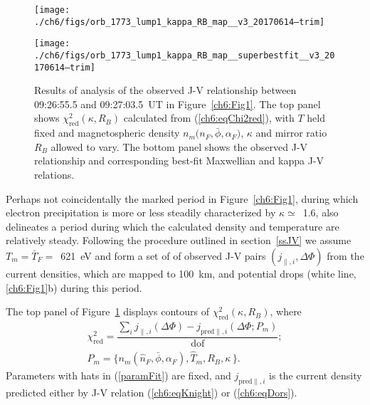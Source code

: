 
  \begin{figure}
    \centering

    \noindent\texttt{[image: ./ch6/figs/orb\_1773\_lump1\_kappa\_RB\_map\_\_v3\_20170614--trim]}

    \vspace{1cm}

    \noindent\texttt{[image: ./ch6/figs/orb\_1773\_lump1\_kappa\_RB\_map\_\_superbestfit\_\_v3\_20170614--trim]}

    \caption[Orbit 1773: Reduced chi-squared values for observed J-V
    relationship with $T$ held fixed and magnetospheric density
    $n_m \big ( n_F, \bar{\phi}, \alpha_F \big )$ $\kappa$ and $R_B$ allowed to
    vary, and corresponding best-fit J-V curves.]{Results of analysis of the
      observed J-V relationship between 09:26:55.5 and 09:27:03.5~UT in
      Figure~\ref{ch6:Fig1}. The top panel shows
      $\chi^2_{\mathrm{red}} ( \kappa, R_B)$ calculated from
      (\ref{ch6:eqChi2red}), with $T$ held fixed and magnetospheric density
      $n_m \big ( n_F, \bar{\phi}, \alpha_F \big )$, $\kappa$ and mirror ratio
      $R_B$ allowed to vary. The bottom panel shows the observed J-V
      relationship and corresponding best-fit Maxwellian and kappa J-V
      relations.}
    \label{ch6:Fig3}
  \end{figure}


  Perhaps not coincidentally the marked period in Figure~\ref{ch6:Fig1}, during
  which electron precipitation is more or less steadily characterized by
  $\kappa \simeq$~1.6, also delineates a period during which the calculated
  density and temperature are relatively steady. Following the procedure
  outlined in section~\ref{ssJV} we assume $T_m = \bar{T}_F =$~621~eV and form a
  set of of observed J-V pairs $( j_{\parallel,i} , \Delta \Phi )$ from the
  current densities, which are mapped to 100~km, and potential drops (white
  line, \ref{ch6:Fig1}b) during this period.

  The top panel of Figure~\ref{ch6:Fig3} displays contours of
  $\chi^2_{\textrm{red}} ( \kappa, R_B )$, where
  \begin{subequations}
    \begin{align} \chi^2_{\mathrm{red}} = \dfrac{\sum_i j_{\parallel,i} (\Delta \Phi) - j_{\textrm{pred}\parallel,i}(\Delta \Phi; P_m)}{\mathrm{dof}}; \label{ch6:eqChi2red} \\
      P_m = \Big \{ n_m ( \hat{n}_F, \bar{\phi} , \alpha_F ), \hat{T}_m, R_B,
      \kappa \, \Big \}. \label{paramFit}
    \end{align}
  \end{subequations}
  Parameters with hats in (\ref{paramFit}) are fixed, and
  $j_{\textrm{pred}\parallel,i} $ is the current density predicted either by J-V
  relation (\ref{ch6:eqKnight}) or (\ref{ch6:eqDors}).

